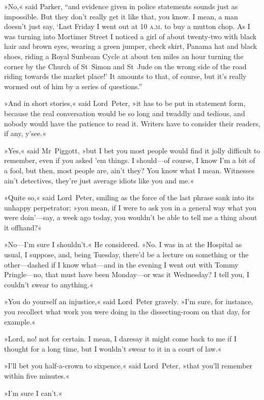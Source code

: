 »No,« said Parker, \enquote{and evidence given in police statements sounds just as impossible. But they don't really get it like that, you know. I mean, a man doesn't just say, \enquote{Last Friday I went out at 10 \textsc{a.m.} to buy a mutton chop. As I was turning into Mortimer Street I noticed a girl of about twenty-two with black hair and brown eyes, wearing a green jumper, check skirt, Panama hat and black shoes, riding a Royal Sunbeam Cycle at about ten miles an hour turning the corner by the Church of St~Simon and St~Jude on the wrong side of the road riding towards the market place!} It amounts to that, of course, but it's really wormed out of him by a series of questions.}

»And in short stories,« said Lord~Peter, »it has to be put in statement form, because the real conversation would be so long and twaddly and tedious, and nobody would have the patience to read it. Writers have to consider their readers, if any, y'see.«

»Yes,« said Mr~Piggott, »but I bet you most people would find it jolly difficult to remember, even if you asked 'em things. I should—of course, I know I'm a bit of a fool, but then, most people are, ain't they? You know what I mean. Witnesses ain't detectives, they're just average idiots like you and me.«

»Quite so,« said Lord~Peter, smiling as the force of the last phrase sank into its unhappy perpetrator; »you mean, if I were to ask you in a general way what you were doin'---say, a week ago today, you wouldn't be able to tell me a thing about it offhand?«

»No—I'm sure I shouldn't.« He considered. »No. I was in at the Hospital as usual, I suppose, and, being Tuesday, there'd be a lecture on something or the other—dashed if I know what—and in the evening I went out with Tommy Pringle—no, that must have been Monday—or was it Wednesday? I tell you, I couldn't swear to anything.«

»You do yourself an injustice,« said Lord~Peter gravely. »I'm sure, for instance, you recollect what work you were doing in the dissecting-room on that day, for example.«

»Lord, no! not for certain. I mean, I daresay it might come back to me if I thought for a long time, but I wouldn't swear to it in a court of law.«

»I'll bet you half-a-crown to sixpence,« said Lord~Peter, »that you'll remember within five minutes.«

»I'm sure I can't.«


